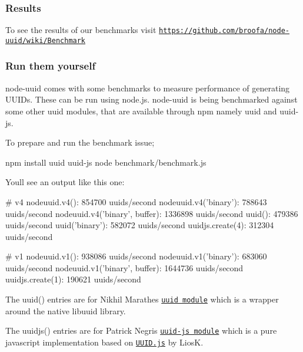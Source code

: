 \subsubsection*{Results}

To see the results of our benchmarks visit \href{https://github.com/broofa/node-uuid/wiki/Benchmark}{\tt https\+://github.\+com/broofa/node-\/uuid/wiki/\+Benchmark}

\subsubsection*{Run them yourself}

node-\/uuid comes with some benchmarks to measure performance of generating U\+U\+I\+Ds. These can be run using node.\+js. node-\/uuid is being benchmarked against some other uuid modules, that are available through npm namely {\ttfamily uuid} and {\ttfamily uuid-\/js}.

To prepare and run the benchmark issue;


\begin{DoxyCode}
npm install uuid uuid-js
node benchmark/benchmark.js
\end{DoxyCode}


You\textquotesingle{}ll see an output like this one\+:


\begin{DoxyCode}
# v4
nodeuuid.v4(): 854700 uuids/second
nodeuuid.v4('binary'): 788643 uuids/second
nodeuuid.v4('binary', buffer): 1336898 uuids/second
uuid(): 479386 uuids/second
uuid('binary'): 582072 uuids/second
uuidjs.create(4): 312304 uuids/second

# v1
nodeuuid.v1(): 938086 uuids/second
nodeuuid.v1('binary'): 683060 uuids/second
nodeuuid.v1('binary', buffer): 1644736 uuids/second
uuidjs.create(1): 190621 uuids/second
\end{DoxyCode}



\begin{DoxyItemize}
\item The {\ttfamily uuid()} entries are for Nikhil Marathe\textquotesingle{}s \href{https://bitbucket.org/nikhilm/uuidjs}{\tt uuid module} which is a wrapper around the native libuuid library.
\item The {\ttfamily uuidjs()} entries are for Patrick Negri\textquotesingle{}s \href{https://github.com/pnegri/uuid-js}{\tt uuid-\/js module} which is a pure javascript implementation based on \href{https://github.com/LiosK/UUID.js}{\tt U\+U\+I\+D.\+js} by LiosK.
\end{DoxyItemize}

